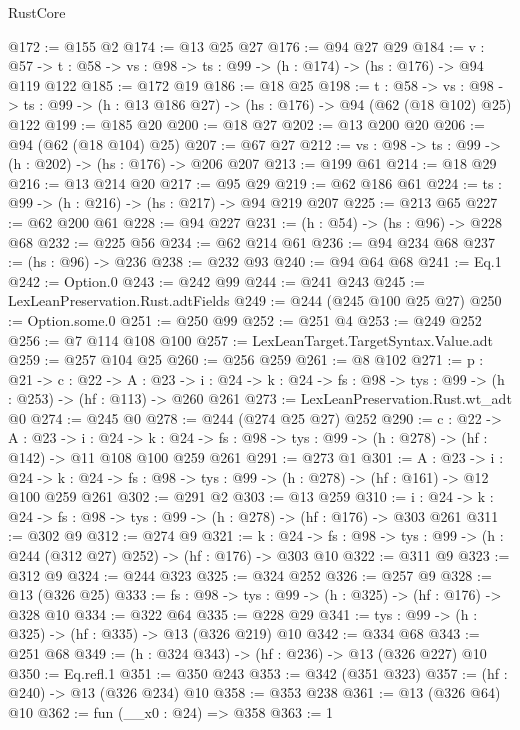 \begin{lexlean}{RustCore}
\begin{coremodule}
@172 := @155 @2
@174 := @13 @25 @27
@176 := @94 @27 @29
@184 := {v : @57} ->
  {t : @58} -> {vs : @98} -> {ts : @99} -> (h : @174) -> (hs : @176) -> @94 @119 @122
@185 := @172 @19
@186 := @18 @25
@198 := {t : @58} ->
  {vs : @98} -> {ts : @99} -> (h : @13 @186 @27) -> (hs : @176) -> @94 (@62 (@18 @102) @25) @122
@199 := @185 @20
@200 := @18 @27
@202 := @13 @200 @20
@206 := @94 (@62 (@18 @104) @25)
@207 := @67 @27
@212 := {vs : @98} -> {ts : @99} -> (h : @202) -> (hs : @176) -> @206 @207
@213 := @199 @61
@214 := @18 @29
@216 := @13 @214 @20
@217 := @95 @29
@219 := @62 @186 @61
@224 := {ts : @99} -> (h : @216) -> (hs : @217) -> @94 @219 @207
@225 := @213 @65
@227 := @62 @200 @61
@228 := @94 @227
@231 := (h : @54) -> (hs : @96) -> @228 @68
@232 := @225 @56
@234 := @62 @214 @61
@236 := @94 @234 @68
@237 := (hs : @96) -> @236
@238 := @232 @93
@240 := @94 @64 @68
@241 := Eq.{1}
@242 := Option.{0}
@243 := @242 @99
@244 := @241 @243
@245 := LexLeanPreservation.Rust.adtFields
@249 := @244 (@245 @100 @25 @27)
@250 := Option.some.{0}
@251 := @250 @99
@252 := @251 @4
@253 := @249 @252
@256 := @7 @114 @108 @100
@257 := LexLeanTarget.TargetSyntax.Value.adt
@259 := @257 @104 @25
@260 := @256 @259
@261 := @8 @102
@271 := {p : @21} ->
  {c : @22} ->
  {A : @23} ->
  {i : @24} -> {k : @24} -> {fs : @98} -> {tys : @99} -> (h : @253) -> (hf : @113) -> @260 @261
@273 := LexLeanPreservation.Rust.wt_adt @0
@274 := @245 @0
@278 := @244 (@274 @25 @27) @252
@290 := {c : @22} ->
  {A : @23} ->
  {i : @24} ->
  {k : @24} -> {fs : @98} -> {tys : @99} -> (h : @278) -> (hf : @142) -> @11 @108 @100 @259 @261
@291 := @273 @1
@301 := {A : @23} ->
  {i : @24} ->
  {k : @24} -> {fs : @98} -> {tys : @99} -> (h : @278) -> (hf : @161) -> @12 @100 @259 @261
@302 := @291 @2
@303 := @13 @259
@310 := {i : @24} ->
  {k : @24} -> {fs : @98} -> {tys : @99} -> (h : @278) -> (hf : @176) -> @303 @261
@311 := @302 @9
@312 := @274 @9
@321 := {k : @24} ->
  {fs : @98} -> {tys : @99} -> (h : @244 (@312 @27) @252) -> (hf : @176) -> @303 @10
@322 := @311 @9
@323 := @312 @9
@324 := @244 @323
@325 := @324 @252
@326 := @257 @9
@328 := @13 (@326 @25)
@333 := {fs : @98} -> {tys : @99} -> (h : @325) -> (hf : @176) -> @328 @10
@334 := @322 @64
@335 := @228 @29
@341 := {tys : @99} -> (h : @325) -> (hf : @335) -> @13 (@326 @219) @10
@342 := @334 @68
@343 := @251 @68
@349 := (h : @324 @343) -> (hf : @236) -> @13 (@326 @227) @10
@350 := Eq.refl.{1}
@351 := @350 @243
@353 := @342 (@351 @323)
@357 := (hf : @240) -> @13 (@326 @234) @10
@358 := @353 @238
@361 := @13 (@326 @64) @10
@362 := fun (__x0 : @24) => @358
@363 := 1

\end{coremodule}
\end{lexlean}
